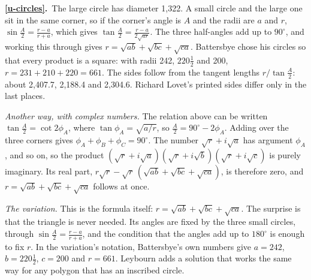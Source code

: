 \documentclass[11pt,a4paper]{article}
\newcommand{\ans}[2]{\par\smallskip\noindent\textbf{\ref{#1}.}\ #2}
\begin{document}
\ans{u-circles}{The large circle has diameter 1,322. A small circle and the large one sit in the
same corner, so if the corner's angle is $A$ and the radii are $a$ and $r$,
$\sin\tfrac A2 = \tfrac{r-a}{r+a}$, which gives $\tan\tfrac A2 = \tfrac{r-a}{2\sqrt{ar}}$. The three
half-angles add up to $90^\circ$, and working this through gives
$r = \sqrt{ab} + \sqrt{bc} + \sqrt{ca}$. Battersbye chose his circles so that every product
is a square: with radii 242, $220\tfrac12$ and 200, $r = 231 + 210 + 220 = 661$. The sides
follow from the tangent lengths $r/\tan\tfrac A2$: about 2,407.7, 2,188.4 and 2,304.6.
Richard Lovet's printed sides differ only in the last places.

\emph{Another way, with complex numbers.} The relation above can be written
$\tan\tfrac A2 = \cot 2\phi_A$, where $\tan\phi_A = \sqrt{a/r}$, so $\tfrac A2 = 90^\circ - 2\phi_A$.
Adding over the three corners gives $\phi_A + \phi_B + \phi_C = 90^\circ$. The number
$\sqrt r + i\sqrt a$ has argument $\phi_A$, and so on, so the product
$(\sqrt r + i\sqrt a)(\sqrt r + i\sqrt b)(\sqrt r + i\sqrt c)$ is purely imaginary. Its real
part, $r\sqrt r - \sqrt r\,(\sqrt{ab} + \sqrt{bc} + \sqrt{ca})$, is therefore zero, and
$r = \sqrt{ab} + \sqrt{bc} + \sqrt{ca}$ follows at once.

\emph{The variation.} This is the formula itself: $r = \sqrt{ab} + \sqrt{bc} + \sqrt{ca}$.
The surprise is that the triangle is never needed. Its angles are fixed by the three small
circles, through $\sin\tfrac A2 = \tfrac{r-a}{r+a}$, and the condition that the angles add
up to $180^\circ$ is enough to fix $r$. In the variation's notation, Battersbye's own
numbers give $a = 242$, $b = 220\tfrac12$, $c = 200$ and $r = 661$. Leybourn adds a solution
that works the same way for any polygon that has an inscribed circle.}
\end{document}

